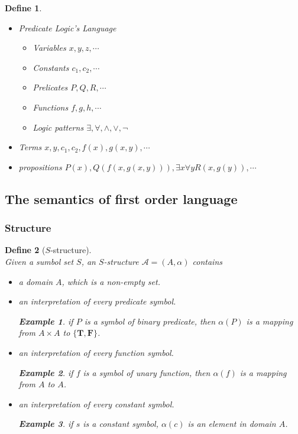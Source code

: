 \documentclass{ctexart}
\newcommand{\。}{．} %
\newenvironment{kuang3}{
    \begin{tcolorbox}[enhanced, breakable, colback=hlan!5!white, boxrule=0pt, frame hidden,
        borderline south={0.5mm}{0.1mm}{hlan}]
    }
    {\end{tcolorbox}}
\newenvironment{lvse}{
    \begin{tcolorbox}[enhanced, breakable, colback=qlv, boxrule=0pt, frame hidden,
        borderline west={0.7mm}{0.1mm}{slv}]
    }
    {\end{tcolorbox}}
\theoremstyle{t} %
\newtheorem{dyhj}{\color{slv} Define}[subsection] %
\newtheorem{lthj}{\color{szi} Example}[subsection]
\newenvironment{dy}{\begin{lvse}\begin{dyhj}}{\end{dyhj}\end{lvse}}
\begin{document}
\begin{dy} \quad
    \begin{itemize}
        \item Predicate Logic's Language
        \begin{itemize}
            \item Variables $x, y, z, \cdots$
            \item Constants $c_1, c_2, \cdots$
            \item Prelicates $P, Q, R, \cdots$
            \item Functions $f, g, h, \cdots$
            \item Logic patterns $\exists, \forall, \land, \lor, \lnot$
        \end{itemize}
        \item Terms $x, y, c_1, c_2, f(x), g(x, y), \cdots$
        \item propositions $P(x), Q(f(x, g(x, y))), \exists x \forall y R(x, g(y)), \cdots$
    \end{itemize}
\end{dy}

\begin{kuang3}
    \subsection{The semantics of first order language}
\end{kuang3}

\subsubsection{Structure}

\begin{dy}[$S$-structure]\quad \\
    Given a sumbol set $S$, an $S$-structure $\mathcal{A} = \left(A, \alpha\right)$ contains
    \begin{itemize}
        \item a domain $A$, which is a non-empty set.
        \item an interpretation of every predicate symbol.
        \begin{lthj}
            if $P$ is a symbol of binary predicate, then $\alpha(P)$ is a mapping from $A \times A$ to $\{\mathbf{T}, \mathbf{F}\}$.
        \end{lthj}
        \item an interpretation of every function symbol.
        \begin{lthj}
            if $f$ is a symbol of unary function, then $\alpha(f)$ is a mapping from $A$ to $A$.
        \end{lthj}
        \item an interpretation of every constant symbol.
        \begin{lthj}
            if $s$ is a constant symbol, $\alpha(c)$ is an element in domain $A$.
        \end{lthj}
    \end{itemize}
\end{dy}
\end{document}
